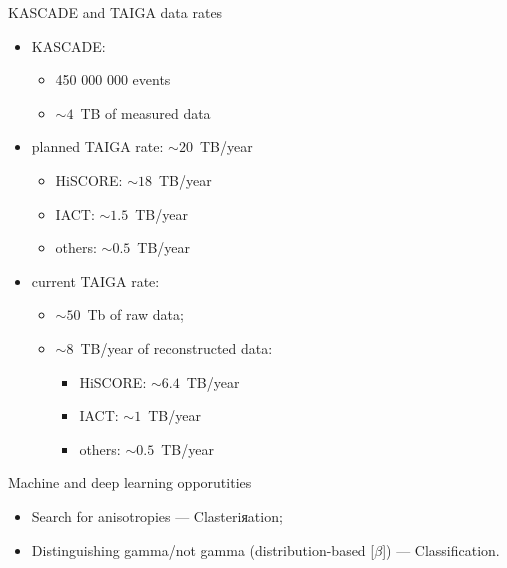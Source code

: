 \begin{frame}{KASCADE and TAIGA data rates}
\begin{minipage}[c]{0.52\textwidth}
  \begin{itemize}
    \item KASCADE:
    \begin{itemize}
      \item 450 000 000 events
      \item $\sim 4$~TB of measured data
    \end{itemize}
    \vspace{1em}
    \item planned TAIGA rate: $\sim 20$~TB/year
    \begin{itemize}
      \item HiSCORE: $\sim 18$~TB/year
      \item IACT: $\sim 1.5$~TB/year
      \item others: $\sim 0.5$~TB/year
    \end{itemize}
  \end{itemize}
\end{minipage}
\hfill
\begin{minipage}[c]{0.47\textwidth}
\vspace{-3.5em}
  \begin{itemize}
    \item current TAIGA rate: 
    \begin{itemize}
      \item $\sim 50$~Tb of raw data;
      \item $\sim 8$~TB/year of reconstructed data:
      \begin{itemize}
	\item HiSCORE: $\sim 6.4$~TB/year
	\item IACT: $\sim 1$~TB/year
	\item others: $\sim 0.5$~TB/year
      \end{itemize}
    \end{itemize}
  \end{itemize}
\end{minipage}

\end{frame}

\begin{frame}{Machine and deep learning opporutities}
 \begin{itemize}
  \item Search for anisotropies --- Clasteriяation;
  \item Distinguishing gamma/not gamma (distribution-based [$\beta$]) --- Classification.
 \end{itemize}

\end{frame}
